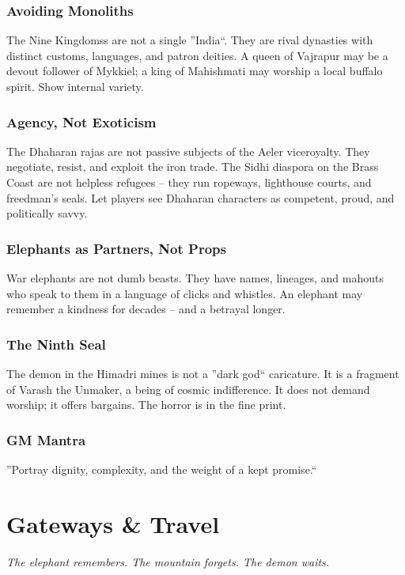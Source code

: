 \documentclass[12pt,oneside]{book}
\begin{document}
\subsection*{Avoiding Monoliths}
The Nine Kingdomss are not a single ''India``. They are rival dynasties with distinct customs, languages, and patron deities. A queen of Vajrapur may be a devout follower of Mykkiel; a king of Mahishmati may worship a local buffalo spirit. Show internal variety.

\subsection*{Agency, Not Exoticism}
The Dhaharan rajas are not passive subjects of the Aeler viceroyalty. They negotiate, resist, and exploit the iron trade. The Sidhi diaspora on the Brass Coast are not helpless refugees -- they run ropeways, lighthouse courts, and freedman's seals. Let players see Dhaharan characters as competent, proud, and politically savvy.

\subsection*{Elephants as Partners, Not Props}
War elephants are not dumb beasts. They have names, lineages, and mahouts who speak to them in a language of clicks and whistles. An elephant may remember a kindness for decades -- and a betrayal longer.

\subsection*{The Ninth Seal}
The demon in the Himadri mines is not a ''dark god`` caricature. It is a fragment of Varash the Unmaker, a being of cosmic indifference. It does not demand worship; it offers bargains. The horror is in the fine print.

\subsection*{GM Mantra}
''Portray dignity, complexity, and the weight of a kept promise.``

\mainmatter


\chapter{Gateways \& Travel}
\emph{The elephant remembers. The mountain forgets. The demon waits.}
\end{document}
